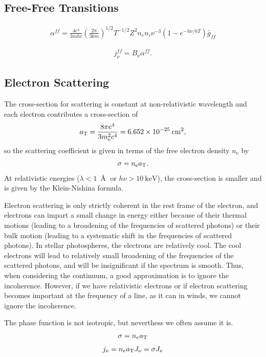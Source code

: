 \subsection{Free-Free Transitions}

\begin{align}
\alpha^{ff} = 
\frac{4e^4}{3mhc}\left(\frac{2\pi}{3km}\right)^{1/2}
T^{-1/2} Z^2 n_e n_i \nu^{-3} (1 - e^{-h\nu/kT}) \bar g_{ff}
\end{align}

\begin{align}
j^{ff}_\nu = B_\nu \alpha^{ff}.
\end{align}

\subsection{Electron Scattering}

The cross-section for scattering is constant
at non-relativistic wavelength and each electron contributes
a cross-section of
\begin{align}
a_\mathrm{T} = 
\frac{8 \pi e^4}{3 m_\mathrm{e}^2 c^4} = 6.652 \times
10^{-25}\:\mathrm{cm^2},
\end{align}
so the scattering coefficient is given in terms of the free
electron density $n_\mathrm{e}$ by
\begin{align}
\sigma = n_\mathrm{e} a_\mathrm{T}.
\end{align}
At relativistic energies ($\lambda < 1\:\Angstrom$ or $h\nu
> 10\:\mathrm{keV}$), the cross-section is smaller and is
given by the Klein-Nishina formula. 

Electron scattering is only strictly coherent in the rest
frame of the electron, and electrons can impart a small
change in energy either because of their thermal motions
(leading to a broadening of the frequencies of scattered
photons) or their bulk motion (leading to a systematic shift
in the frequencies of scattered photons). In stellar
photospheres, the electrons are relatively cool. The cool
electrons will lead to relatively small broadening of the
frequencies of the scattered photons, and will be
insignificant if the spectrum is smooth. Thus, when
considering the continuum, a good approximation is to ignore
the incoherence. However, if we have relativistic electrons
or if electron scattering becomes important at the frequency
of a line, as it can in winds, we cannot ignore the
incoherence.

The phase function is not isotropic, but neverthess we often assume it
is.
\begin{align}
\sigma = n_e a_\mathrm{T}
\end{align}
\begin{align}
j_\nu = n_e a_\mathrm{T} J_\nu = \sigma J_\nu
\end{align}


